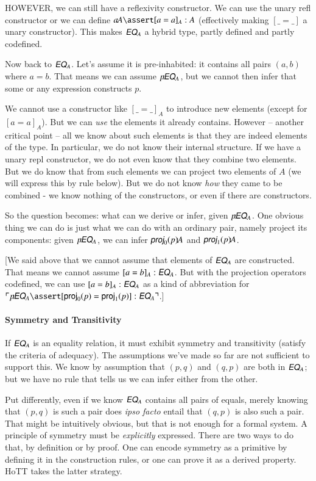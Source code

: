 HOWEVER, we can still have a reflexivity constructor. We can use the
unary \textsf{refl} constructor or we can define \(a\type A\linfer
[a=a]_A:A\) (effectively making \([\_=\_]\) a unary constructor). This makes
  \(\EQ_A\) a hybrid type, partly defined and partly codefined.

Now back to \(\EQ_A\). Let's assume it is pre-inhabited: it contains
all pairs \((a,b)\) where \(a=b\). That means we can assume
\(p\type\EQ_A\), but we cannot then infer that some or any expression
constructs \(p\).

 We cannot use a constructor like \([\_=\_]_A\) to introduce new
 elements (except for \([a=a]_A\)). But we can \textit{use} the
 elements it already contains. However -- another critical point --
 all we know about such elements is that they are indeed elements of
 the type. In particular, we do not know their internal structure. If
 we have a unary repl constructor, we do not even know that they
 combine two elements. But we do know that from such elements we can
 project two elements of \(A\) (we will express this by rule below).
 But we do not know \textit{how} they came to be combined - we know
 nothing of the constructors, or even if there are constructors.

 So the question becomes: what can we derive or infer, given
 \(p\type\EQ_A\). One obvious thing we can do is just what we can do
 with an ordinary pair, namely project its components: given
 \(p\type\EQ_A\), we can infer \(\textsf{\slshape proj}_0(p)\type A\)
 and \(\textsf{\slshape proj}_1(p)\type A\).

[We said above that we cannot assume that elements of \(\EQ_A\) are
  constructed. That means we cannot assume \([a=b]_A:\EQ_A\). But with
  the projection operators codefined, we can use \([a=b]_A:\EQ_A\) as
  a kind of abbreviation for \(\ulcorner p\type \EQ_A\linfer
  [\textsf{proj}_0(p) = \textsf{proj}_1(p)]:\EQ_A\urcorner\).]

\paragraph{Symmetry and Transitivity}
If \(\EQ_A\) is an equality relation, it must exhibit symmetry and
transitivity (satisfy the criteria of adequacy). The assumptions we've
made so far are not sufficient to support this. We know by assumption
that \((p,q)\) and \((q,p)\) are both in \(\EQ_A\); but we have no
rule that tells us we can infer either from the other.

Put differently, even if we know \(\EQ_A\) contains all pairs of
equals, merely knowing that \((p,q)\) is such a pair does \textit{ipso
  facto} entail that \((q,p)\) is also such a pair. That might be
intuitively obvious, but that is not enough for a formal system. A
principle of symmetry must be \textit{explicitly} expressed. There are
two ways to do that, by definition or by proof. One can encode
symmetry as a primitive by defining it in the construction rules, or
one can prove it as a derived property. HoTT takes the latter
strategy.

